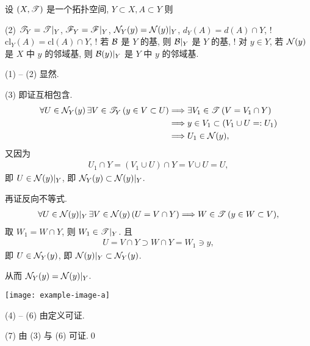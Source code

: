     \begin{Proposition}[子空间中集合的拓扑运算]
        设 $ (X, \mathscr{T}) $ 是一个拓扑空间, $ Y\subset X, A\subset Y $ 则
        \begin{lpbn}(2)
            \task $ \mathscr{T}_{Y}=\mathscr{T}|_{Y} $,
            \task $ \mathscr{F}_{Y}=\mathscr{F}|_{Y} $,
            \task $ \mathcal{N}_{Y}(y)=\mathcal{N}(y)|_{Y} $,
            \task $ d_{Y}(A)=d(A)\cap Y $,
            \task! $ \mathrm{cl}_{Y}(A)=\mathrm{cl}(A)\cap Y $,
            \task! 若 $ \mathcal{B} $ 是 $ Y $ 的基, 则 $ \mathcal{B}|_{Y} $ 是 $ Y $ 的基,
            \task! 对 $ y\in Y $, 若 $ \mathcal{N}(y) $ 是 $ X $ 中 $ y $ 的邻域基, 则 $ \mathcal{B}(y)|_{Y} $ 是 $ Y $ 中 $ y $ 的邻域基. 
        \end{lpbn}
    \end{Proposition}
    \begin{Proof}
        (1) -- (2) 显然.
        
        (3) 即证互相包含. 
        \begin{align*}
            \forall U\in\mathcal{N}_{Y}(y)\,\exists V\in\mathscr{T}_{Y}\,(y\in V\subset U) & \Longrightarrow \exists V_{1}\in\mathscr{T}\,(V=V_{1}\cap Y)\\
            & \Longrightarrow y\in V_{1}\subset(V_{1}\cup U=:U_{1})\\
            & \Longrightarrow U_{1}\in\mathcal{N}(y),
        \end{align*}
        又因为
        \begin{align*}
            U_{1}\cap Y=(V_{1}\cup U)\cap Y=V\cup U=U,
        \end{align*}
        即 $ U\in\mathcal{N}(y)|_{Y} $, 即 $ \mathcal{N}_{Y}(y)\subset \mathcal{N}(y)|_{Y} $.

        再证反向不等式.
        \begin{align*}
            \forall U\in\mathcal{N}(y)|_{Y}\,\exists V\in\mathcal{N}(y)\,(U=V\cap Y)\Longrightarrow W\in\mathscr{T}\,(y\in W\subset V),
        \end{align*}
        取 $ W_{1}=W\cap Y $, 则 $ W_{1}\in\mathscr{T}|_{Y} $. 且
        \begin{align*}
            U=V\cap Y\supset W\cap Y=W_{1}\ni y,
        \end{align*}
        即 $ U\in\mathcal{N}_{Y}(y) $, 即 $ \mathcal{N}(y)|_{Y}\subset \mathcal{N}_{Y}(y) $.

        从而 $ \mathcal{N}_{Y}(y)=\mathcal{N}(y)|_{Y} $.
        \begin{center}
            \texttt{[image: example-image-a]}
        \end{center}

        (4) -- (6) 由定义可证.

        (7) 由 (3) 与 (6) 可证.\qed
    \end{Proof}
    
